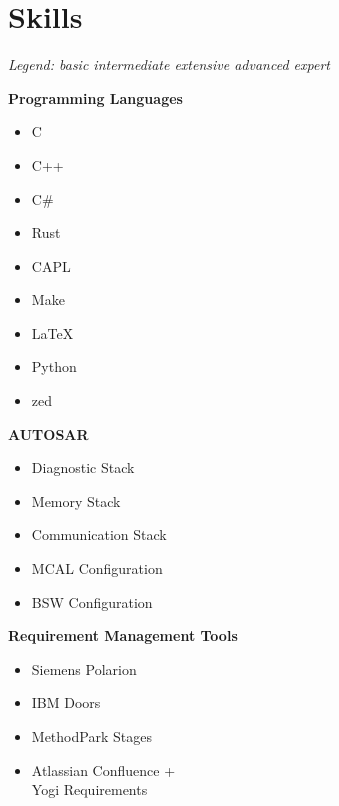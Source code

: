 \section*{Skills}

{\small\textit{Legend:  basic \quad {} intermediate \quad {} extensive \quad {} advanced \quad {} expert}}

\vspace{0.75em}

\begin{minipage}[t]{0.48\textwidth}
\textbf{Programming Languages}
\begin{itemize}[leftmargin=*,noitemsep,topsep=0pt]
    \item C 
    \item C++ 
    \item C\# 
    \item Rust 
    \item CAPL 
    \item Make 
    \item \LaTeX {}
    \item Python 
    \item zed 
\end{itemize}

\vspace{0.5em}

\textbf{AUTOSAR}
\begin{itemize}[leftmargin=*,noitemsep,topsep=0pt]
    \item Diagnostic Stack 
    \item Memory Stack 
    \item Communication Stack 
    \item MCAL Configuration 
    \item BSW Configuration 
\end{itemize}

\vspace{0.5em}

\textbf{Requirement Management Tools}
\begin{itemize}[leftmargin=*,noitemsep,topsep=0pt]
    \item Siemens Polarion 
    \item IBM Doors 
    \item MethodPark Stages 
    \item Atlassian Confluence + \\Yogi Requirements 
\end{itemize}


\end{minipage}
